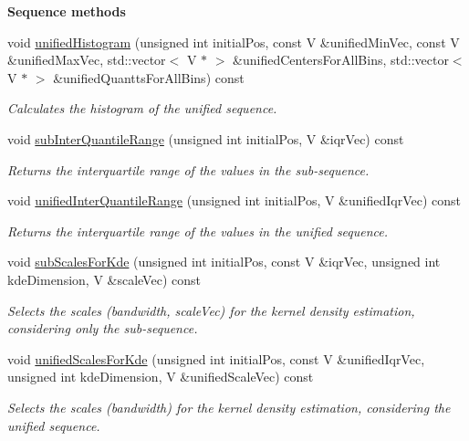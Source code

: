 \begin{Indent}{\bf Sequence methods}
\begin{DoxyCompactItemize}
void \hyperlink{class_q_u_e_s_o_1_1_sequence_of_vectors_a8ef8ac8a2b2af3a24fa4c6d2b309b463}{unified\-Histogram} (unsigned int initial\-Pos, const V \&unified\-Min\-Vec, const V \&unified\-Max\-Vec, std\-::vector$<$ V $\ast$ $>$ \&unified\-Centers\-For\-All\-Bins, std\-::vector$<$ V $\ast$ $>$ \&unified\-Quantts\-For\-All\-Bins) const 
\begin{DoxyCompactList}\small\item\em Calculates the histogram of the unified sequence. \end{DoxyCompactList}\item 
void \hyperlink{class_q_u_e_s_o_1_1_sequence_of_vectors_a86985625ab899ea03ecf4bc56538ea49}{sub\-Inter\-Quantile\-Range} (unsigned int initial\-Pos, V \&iqr\-Vec) const 
\begin{DoxyCompactList}\small\item\em Returns the interquartile range of the values in the sub-\/sequence. \end{DoxyCompactList}\item 
void \hyperlink{class_q_u_e_s_o_1_1_sequence_of_vectors_ab4f95ccde1110f4138a9bfebb4eca822}{unified\-Inter\-Quantile\-Range} (unsigned int initial\-Pos, V \&unified\-Iqr\-Vec) const 
\begin{DoxyCompactList}\small\item\em Returns the interquartile range of the values in the unified sequence. \end{DoxyCompactList}\item 
void \hyperlink{class_q_u_e_s_o_1_1_sequence_of_vectors_afd08d0c5c360636708f530dec8c67e38}{sub\-Scales\-For\-Kde} (unsigned int initial\-Pos, const V \&iqr\-Vec, unsigned int kde\-Dimension, V \&scale\-Vec) const 
\begin{DoxyCompactList}\small\item\em Selects the scales (bandwidth, {\ttfamily scale\-Vec}) for the kernel density estimation, considering only the sub-\/sequence. \end{DoxyCompactList}\item 
void \hyperlink{class_q_u_e_s_o_1_1_sequence_of_vectors_a88ac94235c0c7ab1858fcd54fd40d087}{unified\-Scales\-For\-Kde} (unsigned int initial\-Pos, const V \&unified\-Iqr\-Vec, unsigned int kde\-Dimension, V \&unified\-Scale\-Vec) const 
\begin{DoxyCompactList}\small\item\em Selects the scales (bandwidth) for the kernel density estimation, considering the unified sequence. \end{DoxyCompactList}\item 

\end{DoxyCompactItemize}
\end{Indent}
